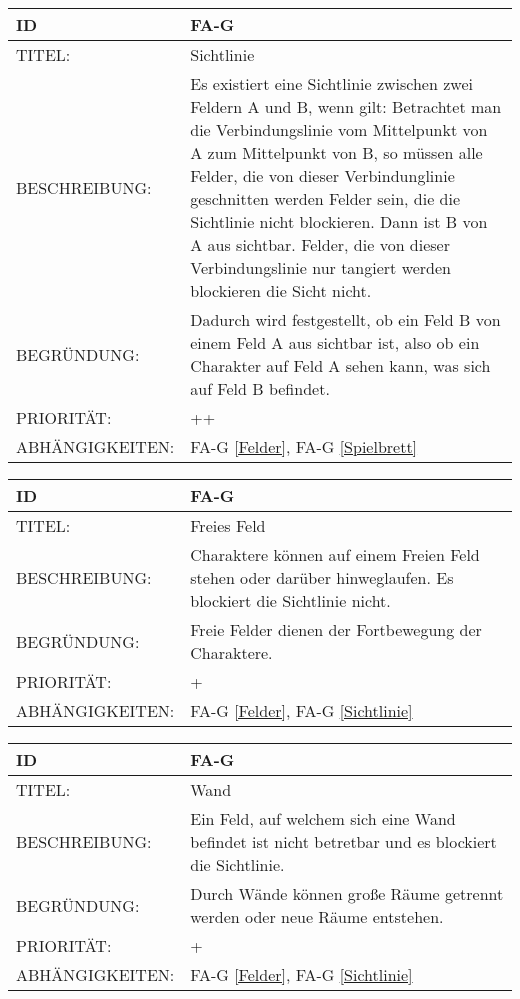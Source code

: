 \begin{tabularx}{16cm}{l|X}
	{table}\label{Sichtlinie}
	\textbf{ID} & \textbf{FA-G \arabic{table}} \\
	\hline
	TITEL: & Sichtlinie \\
	\hline
	BESCHREIBUNG: & Es existiert eine Sichtlinie zwischen zwei Feldern A und B, wenn gilt: Betrachtet man die Verbindungslinie vom Mittelpunkt von A zum Mittelpunkt von B, so müssen alle Felder, die von dieser Verbindunglinie geschnitten werden Felder sein, die die Sichtlinie nicht blockieren. Dann ist B von A aus sichtbar. Felder, die von dieser Verbindungslinie nur tangiert werden blockieren die Sicht nicht. \\
	\hline
	BEGRÜNDUNG: & Dadurch wird festgestellt, ob ein Feld B von einem Feld A aus sichtbar ist, also ob ein Charakter auf Feld A sehen kann, was sich auf Feld B befindet. \\
	\hline
	PRIORITÄT: & ++\\
	\hline
	ABHÄNGIGKEITEN: & FA-G \ref{Felder}, FA-G \ref{Spielbrett} \\
\end{tabularx}

\begin{tabularx}{16cm}{l|X}
	{table}\label{Freies Feld}
	\textbf{ID} & \textbf{FA-G \arabic{table}} \\
	\hline
	TITEL: & Freies Feld \\
	\hline
	BESCHREIBUNG: & Charaktere können auf einem Freien Feld stehen oder darüber hinweglaufen. Es blockiert die Sichtlinie nicht. \\
	\hline
	BEGRÜNDUNG: & Freie Felder dienen der Fortbewegung der Charaktere. \\
	\hline
	PRIORITÄT: & +\\
	\hline
	ABHÄNGIGKEITEN: & FA-G \ref{Felder}, FA-G \ref{Sichtlinie} \\
\end{tabularx}

\begin{tabularx}{16cm}{l|X}
	{table}\label{Wand}
	\textbf{ID} & \textbf{FA-G \arabic{table}} \\
	\hline
	TITEL: & Wand \\
	\hline
	BESCHREIBUNG: & Ein Feld, auf welchem sich eine Wand befindet ist nicht betretbar und es blockiert die Sichtlinie. \\
	\hline
	BEGRÜNDUNG: & Durch Wände können große Räume getrennt werden oder neue Räume entstehen. \\
	\hline
	PRIORITÄT: & +\\
	\hline
	ABHÄNGIGKEITEN: & FA-G \ref{Felder}, FA-G \ref{Sichtlinie} \\
\end{tabularx}

